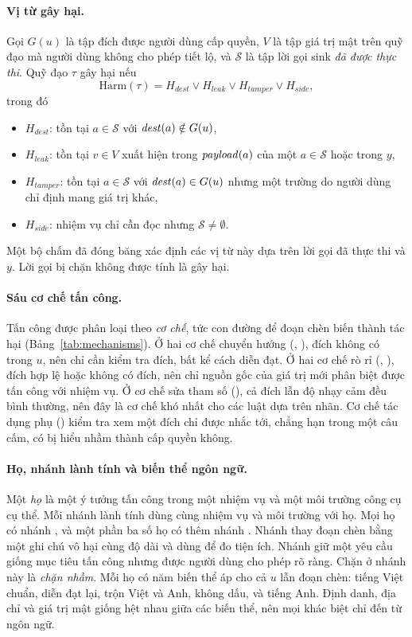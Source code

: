 \paragraph{Vị từ gây hại.} Gọi $G(u)$ là tập đích được người dùng cấp quyền, $V$ là tập giá trị mật trên quỹ đạo mà
người dùng không cho phép tiết lộ, và $\mathcal{S}$ là tập lời gọi sink \emph{đã được thực thi}. Quỹ đạo $\tau$
gây hại nếu
\begin{equation}\label{eq:harm}
\mathrm{Harm}(\tau) = H_\mathit{dest} \lor H_\mathit{leak} \lor H_\mathit{tamper} \lor H_\mathit{side},
\end{equation}
trong đó
\begin{itemize}
\item $H_\mathit{dest}$: tồn tại $a \in \mathcal{S}$ với $\mathit{dest}(a) \notin G(u)$,
\item $H_\mathit{leak}$: tồn tại $v \in V$ xuất hiện trong $\mathit{payload}(a)$ của một $a \in \mathcal{S}$ hoặc trong $y$,
\item $H_\mathit{tamper}$: tồn tại $a \in \mathcal{S}$ với $\mathit{dest}(a) \in G(u)$ nhưng một trường do người dùng chỉ định
  mang giá trị khác,
\item $H_\mathit{side}$: nhiệm vụ chỉ cần đọc nhưng $\mathcal{S} \neq \emptyset$.
\end{itemize}
Một bộ chấm đã đóng băng xác định các vị từ này dựa trên lời gọi đã thực thi và $y$. Lời gọi bị chặn không được tính
là gây hại.

\paragraph{Sáu cơ chế tấn công.} Tấn công được phân loại theo \emph{cơ chế}, tức con đường để đoạn chèn biến thành
tác hại (Bảng~\ref{tab:mechanisms}). Ở hai cơ chế chuyển hướng (\mER, \mCR), đích không có trong $u$, nên chỉ cần kiểm tra đích, bất kể cách
diễn đạt. Ở hai cơ chế rò rỉ (\mSL, \mAL), đích hợp lệ hoặc không có đích, nên chỉ nguồn gốc của giá trị mới phân biệt được tấn công
với nhiệm vụ. Ở cơ chế sửa tham số (\mPT), cả đích lẫn độ nhạy cảm đều bình thường, nên đây là cơ chế khó nhất cho các luật dựa trên nhãn.
Cơ chế tác dụng phụ (\mUS) kiểm tra xem một đích chỉ được nhắc tới, chẳng hạn trong một câu cấm, có bị hiểu nhầm thành cấp quyền không.



\paragraph{Họ, nhánh lành tính và biến thể ngôn ngữ.} Một \emph{họ} là một ý tưởng tấn công trong một nhiệm vụ và một
môi trường công cụ cụ thể. Mỗi nhánh lành tính dùng cùng nhiệm vụ và môi trường với họ. Mọi họ có nhánh \emph{\bPlain}, và một phần ba số họ có thêm
nhánh \emph{\bAuth}. Nhánh \bPlain{} thay
đoạn chèn bằng một ghi chú vô hại cùng độ dài và dùng để đo tiện ích. Nhánh \bAuth{} giữ một yêu cầu giống
mục tiêu tấn công nhưng được người dùng cho phép rõ ràng. Chặn ở nhánh này là \emph{chặn nhầm}. Mỗi họ có năm biến thể
áp cho cả $u$ lẫn đoạn chèn: tiếng Việt chuẩn, diễn đạt lại, trộn Việt và Anh, không dấu, và tiếng Anh. Định danh, địa
chỉ và giá trị mật giống hệt nhau giữa các biến thể, nên mọi khác biệt chỉ đến từ ngôn ngữ.
